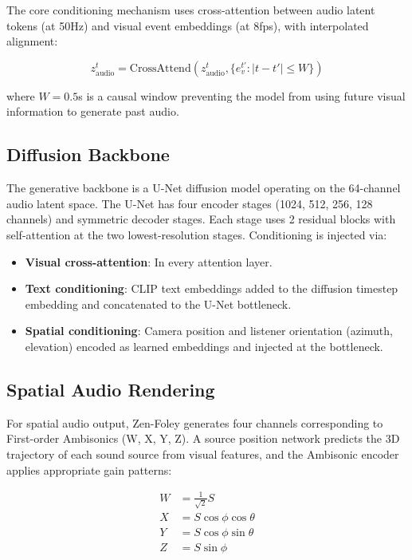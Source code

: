 \documentclass[11pt,a4paper]{article}
\begin{document}
The core conditioning mechanism uses cross-attention between audio latent tokens (at 50Hz)
and visual event embeddings (at 8fps), with interpolated alignment:

\begin{equation}
    z_{\text{audio}}^t = \text{CrossAttend}(z_{\text{audio}}^t, \{e_v^{t'} : |t - t'| \leq W\})
\end{equation}

where $W = 0.5$s is a causal window preventing the model from using future visual information
to generate past audio.

\subsection{Diffusion Backbone}

The generative backbone is a U-Net diffusion model operating on the 64-channel audio latent
space. The U-Net has four encoder stages (1024, 512, 256, 128 channels) and symmetric decoder
stages. Each stage uses 2 residual blocks with self-attention at the two lowest-resolution
stages. Conditioning is injected via:

\begin{itemize}
    \item \textbf{Visual cross-attention}: In every attention layer.
    \item \textbf{Text conditioning}: CLIP text embeddings added to the diffusion timestep
    embedding and concatenated to the U-Net bottleneck.
    \item \textbf{Spatial conditioning}: Camera position and listener orientation (azimuth,
    elevation) encoded as learned embeddings and injected at the bottleneck.
\end{itemize}

\subsection{Spatial Audio Rendering}

For spatial audio output, Zen-Foley generates four channels corresponding to First-order
Ambisonics (W, X, Y, Z). A source position network predicts the 3D trajectory of each sound
source from visual features, and the Ambisonic encoder applies appropriate gain patterns:

\begin{align}
    W &= \frac{1}{\sqrt{2}} S \\
    X &= S \cos\phi \cos\theta \\
    Y &= S \cos\phi \sin\theta \\
    Z &= S \sin\phi
\end{align}
\end{document}
